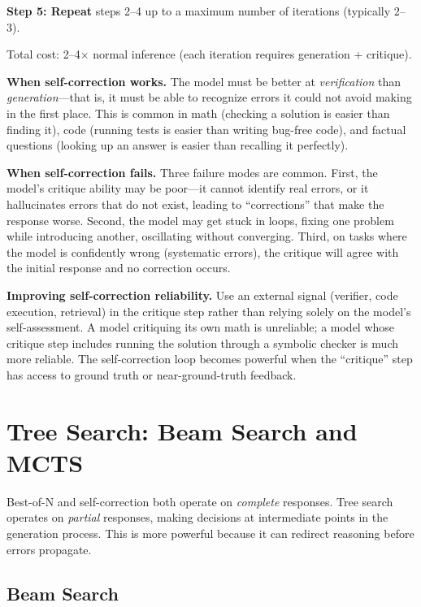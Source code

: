 \begin{chapterenv}
\begin{infobox}
\textbf{Step 5: Repeat} steps 2--4 up to a maximum number of iterations (typically 2--3).

Total cost: 2--4$\times$ normal inference (each iteration requires generation + critique).
\end{infobox}

\textbf{When self-correction works.} The model must be better at \textit{verification} than \textit{generation}---that is, it must be able to recognize errors it could not avoid making in the first place. This is common in math (checking a solution is easier than finding it), code (running tests is easier than writing bug-free code), and factual questions (looking up an answer is easier than recalling it perfectly).

\textbf{When self-correction fails.} Three failure modes are common. First, the model's critique ability may be poor---it cannot identify real errors, or it hallucinates errors that do not exist, leading to ``corrections'' that make the response worse. Second, the model may get stuck in loops, fixing one problem while introducing another, oscillating without converging. Third, on tasks where the model is confidently wrong (systematic errors), the critique will agree with the initial response and no correction occurs.

\begin{tipbox}
\textbf{Improving self-correction reliability.} Use an external signal (verifier, code execution, retrieval) in the critique step rather than relying solely on the model's self-assessment. A model critiquing its own math is unreliable; a model whose critique step includes running the solution through a symbolic checker is much more reliable. The self-correction loop becomes powerful when the ``critique'' step has access to ground truth or near-ground-truth feedback.
\end{tipbox}

\section{Tree Search: Beam Search and MCTS}

Best-of-N and self-correction both operate on \textit{complete} responses. Tree search operates on \textit{partial} responses, making decisions at intermediate points in the generation process. This is more powerful because it can redirect reasoning before errors propagate.

\subsection{Beam Search}


\end{chapterenv}
